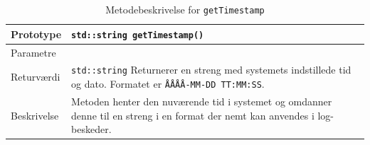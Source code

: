\begin{table}[h]
\begin{tabularx}{\textwidth}{| L{2.5 cm} | Z |} \hline
Prototype & \texttt{std::string getTimestamp()} \\\hline
Parametre & ~ \newline \\\hline
Returværdi &  \texttt{std::string} \newline Returnerer en streng med systemets indstillede tid og dato. Formatet er \texttt{ÅÅÅÅ-MM-DD TT:MM:SS}.\\\hline
Beskrivelse & Metoden henter den nuværende tid i systemet og omdanner denne til en streng i en format der nemt kan anvendes i log-beskeder. \\\hline
\end{tabularx}
\caption{Metodebeskrivelse for \texttt{getTimestamp}}
\label{table:met_getTimestamp}
\end{table}
